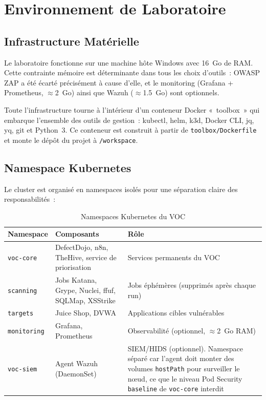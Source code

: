 \documentclass[12pt,a4paper]{report}
\begin{document}
\chapter{Environnement de Laboratoire}

\section{Infrastructure Matérielle}
Le laboratoire fonctionne sur une machine hôte Windows avec 16~Go de RAM. Cette contrainte mémoire est déterminante dans tous les choix d'outils~: OWASP ZAP a été écarté précisément à cause d'elle, et le monitoring (Grafana + Prometheus, $\approx$2~Go) ainsi que Wazuh ($\approx$1.5~Go) sont optionnels.

Toute l'infrastructure tourne à l'intérieur d'un conteneur Docker «~toolbox~» qui embarque l'ensemble des outils de gestion~: kubectl, helm, k3d, Docker CLI, jq, yq, git et Python~3. Ce conteneur est construit à partir de \texttt{toolbox/Dockerfile} et monte le dépôt du projet à \texttt{/workspace}.

\section{Namespace Kubernetes}
Le cluster est organisé en namespaces isolés pour une séparation claire des responsabilités~:

\begin{table}[H]
\centering
\caption{Namespaces Kubernetes du VOC}
\small
\begin{tabularx}{\textwidth}{L{2.1cm} L{4.3cm} X}
\toprule
\textbf{Namespace} & \textbf{Composants} & \textbf{Rôle} \\
\midrule
\texttt{voc-core}   & DefectDojo, n8n, TheHive, service de priorisation & Services permanents du VOC \\
\texttt{scanning}   & Jobs Katana, Grype, Nuclei, ffuf, SQLMap, XSStrike & Jobs éphémères (supprimés après chaque run) \\
\texttt{targets}    & Juice Shop, DVWA & Applications cibles vulnérables \\
\texttt{monitoring} & Grafana, Prometheus & Observabilité (optionnel, $\approx$2~Go RAM) \\
\texttt{voc-siem}   & Agent Wazuh (DaemonSet) & SIEM/HIDS (optionnel). Namespace séparé car l'agent doit monter des volumes \texttt{hostPath} pour surveiller le nœud, ce que le niveau Pod Security \texttt{baseline} de \texttt{voc-core} interdit \\
\bottomrule
\end{tabularx}
\end{table}
\end{document}
